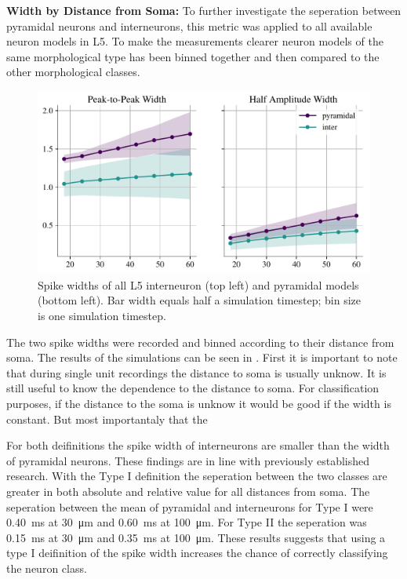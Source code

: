 \documentclass[altfont, fleqn]{uiophd}
\renewcommand{\cref}[1]{{\color{viridis_03}\mycref{#1}}}
\begin{document}
\noindent
\textbf{Width by Distance from Soma:}
To further investigate the seperation between pyramidal
neurons and interneurons, this metric was applied to 
all available neuron models in L5. 
To make the measurements clearer neuron models
of the same morphological type has been binned together
and then compared to the other morphological classes. 

\begin{figure}[h]
    \begin{center}
        \includegraphics[width=\textwidth]{images/sec_4/int_pyr_widths_dist.pdf}
        \caption{
            Spike widths of all L5 interneuron (top left) and pyramidal models 
            (bottom left).
            Bar width equals half a simulation timestep;
            bin size is one simulation timestep.
        }
        \label{fig:4_2_width}
    \end{center}
\end{figure}

The two spike widths were recorded and binned according 
to their distance from soma. 
The results of the simulations can be seen in 
\cref{fig:4_2_width}.
First it is important to note that during single unit 
recordings
the distance to soma is usually unknow. 
It is still useful to know the dependence to 
the distance to soma. 
For classification purposes, if the distance to
the soma is unknow it would be good if the width 
is constant.
But most importantaly that the 

For both deifinitions the spike width of interneurons are smaller
than the width of pyramidal neurons. 
These findings are in line with previously established research.
With the Type I definition the seperation between the two classes 
are greater in both absolute and relative value for all distances from soma.
The seperation between the mean of pyramidal and interneurons 
for Type I were 
\SI{0.40}{\milli\second} at \SI{30}{\micro\metre}
and 
\SI{0.60}{\milli\second} at \SI{100}{\micro\metre}.
For Type II the seperation was 
\SI{0.15}{\milli\second} at \SI{30}{\micro\metre}
and 
\SI{0.35}{\milli\second} at \SI{100}{\micro\metre}.
These results suggests that using a type I deifinition of the spike width
increases the chance of correctly classifying the neuron class.
\end{document}
